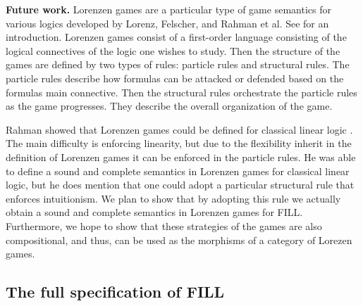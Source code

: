 \textbf{Future work.} Lorenzen games are a particular type of game
semantics for various logics developed by Lorenz, Felscher, and Rahman
et al. See \cite{Keiff:2011,Rahman:2005} for an introduction.
Lorenzen games consist of a first-order language consisting of the
logical connectives of the logic one wishes to study.  Then the
structure of the games are defined by two types of rules: particle
rules and structural rules.  The particle rules describe how formulas
can be attacked or defended based on the formulas main connective.
Then the structural rules orchestrate the particle rules as the game
progresses.  They describe the overall organization of the game.

Rahman showed that Lorenzen games could be defined for classical
linear logic \cite{Rahman:2002}.  The main difficulty is enforcing
linearity, but due to the flexibility inherit in the definition of
Lorenzen games it can be enforced in the particle rules.  He was able
to define a sound and complete semantics in Lorenzen games for
classical linear logic, but he does mention that one could adopt a
particular structural rule that enforces intuitionism.  We plan to
show that by adopting this rule we actually obtain a sound and
complete semantics in Lorenzen games for FILL.  Furthermore, we hope
to show that these strategies of the games are also compositional, and
thus, can be used as the morphisms of a category of Lorezen games.





\appendix

\begin{report}
  \section{The full specification of FILL}
\label{sec:fill_specification}
\FILLall{}
\end{report}

